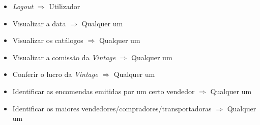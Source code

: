 \begin{itemize}
        \item \textit{Logout} $\Rightarrow$ Utilizador
        
        \item Visualizar a data $\Rightarrow$ Qualquer um
        
        \item Visualizar os catálogos $\Rightarrow$ Qualquer um
        
        \item Visualizar a comissão da \textit{Vintage} $\Rightarrow$ Qualquer um
        
        \item Conferir o lucro da \textit{Vintage} $\Rightarrow$ Qualquer um
        
        \item Identificar as encomendas emitidas por um certo vendedor $\Rightarrow$ Qualquer um
        
        \item Identificar os maiores vendedores/compradores/transportadoras $\Rightarrow$ Qualquer um

    \end{itemize}